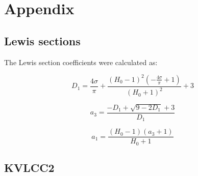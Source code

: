 \section{Appendix}\label{appendix}

    \subsection{Lewis sections}\label{lewis-sections}

    The Lewis section coefficients were calculated as:
 
            
    
    \begin{equation}
D_{1} = \frac{4 \sigma}{\pi} + \frac{\left(H_{0} - 1\right)^{2} \left(- \frac{4 \sigma}{\pi} + 1\right)}{\left(H_{0} + 1\right)^{2}} + 3
\label{eq:equation}
\end{equation}

    
 
            
    
    \begin{equation}
a_{3} = \frac{- D_{1} + \sqrt{9 - 2 D_{1}} + 3}{D_{1}}
\label{eq:equation}
\end{equation}

    
 
            
    
    \begin{equation}
a_{1} = \frac{\left(H_{0} - 1\right) \left(a_{3} + 1\right)}{H_{0} + 1}
\label{eq:equation}
\end{equation}

    

    \subsection{KVLCC2}\label{kvlcc2}
 
            
    
